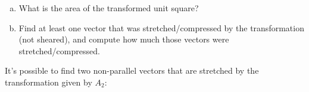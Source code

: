 \begin{applicationActivities}
\begin{activity}{5}
\begin{center}
\end{center}

\begin{enumerate}[(a)]
\item What is the area of the transformed unit square?
\item Find at least one vector that was stretched/compressed by the
      transformation (not sheared),
      and compute how much those vectors were stretched/compressed.
\end{enumerate}
\end{activity}

\begin{observation}
  It's possible to find two non-parallel vectors that are stretched by the
  transformation given by \(A_2\):


\end{observation}
\end{applicationActivities}
